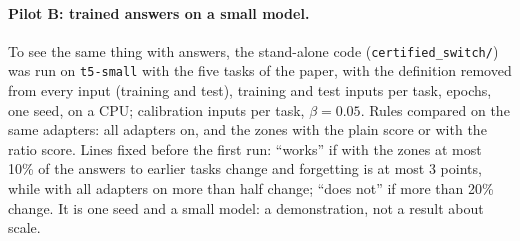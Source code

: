 \paragraph{Pilot B: trained answers on a small model.} To see the same thing with answers, the stand-alone code (\texttt{certified\_switch/}) was run on \texttt{t5-small} with the five tasks of the paper, with the definition removed from every input (training and test), \BoundBTrain{} training and \BoundBTest{} test inputs per task, \BoundBEpochs{} epochs, one seed, on a CPU; \BoundBCal{} calibration inputs per task, $\beta = 0.05$. Rules compared on the same adapters: all adapters on, and the zones with the plain score or with the ratio score.
Lines fixed before the first run: ``works'' if with the zones at most 10\% of the \BoundBCompared{} answers to earlier tasks change and forgetting is at most 3 points, while with all adapters on more than half change; ``does not'' if more than 20\% change. It is one seed and a small model: a demonstration, not a result about scale.

\begin{table}[t]
  \caption{Pilot B, \texttt{t5-small}, five tasks, no definition in any input, one seed. Scores are Rouge-L averages over the tasks: ``Learned'', right after each task was learned, and ``End'', at the end; forgetting is the average over the first four tasks of the drop from right after learning to the end (the last task cannot be forgotten), so it is not the difference of the two columns; ``Changed'': of the \BoundBCompared{} answers to the test inputs of the first four tasks, those that differ at the end. ``Own task'': test inputs given to their own task after the last task. The last column lists, per task in order, the test inputs that lie inside the zone of an older task when the task arrives.}
  \label{tab:boundpilotb}
  \centering
  \footnotesize
  \setlength{\tabcolsep}{3pt}
  
\end{table}

